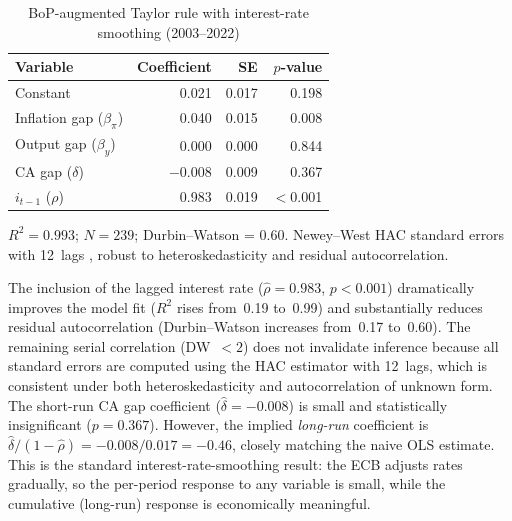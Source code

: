 \begin{table}[htbp]
\centering
\caption{BoP-augmented Taylor rule with interest-rate smoothing (2003--2022)}
\label{tab:ch3_taylor}
\begin{tabular}{@{} l r r r @{}}
\toprule
{Variable} & {Coefficient} & {SE} & {$p$-value} \\
\midrule
Constant              &  0.021 & 0.017 & 0.198 \\
Inflation gap ($\beta_\pi$) &  0.040 & 0.015 & 0.008 \\
Output gap ($\beta_y$)      &  0.000 & 0.000 & 0.844 \\
CA gap ($\delta$)            & $-$0.008 & 0.009 & 0.367 \\
$i_{t-1}$ ($\rho$)           &  0.983 & 0.019 & $<$0.001 \\
\bottomrule
\end{tabular}
\vspace{0.5em}

\begin{minipage}{\textwidth}
\footnotesize $R^2 = 0.993$; $N = 239$; Durbin--Watson = 0.60.  Newey--West HAC standard errors with 12~lags \citep{newey1987simple}, robust to heteroskedasticity and residual autocorrelation.
\end{minipage}
\end{table}

The inclusion of the lagged interest rate ($\hat{\rho} = 0.983$, $p < 0.001$) dramatically improves the model fit ($R^2$ rises from~0.19 to~0.99) and substantially reduces residual autocorrelation (Durbin--Watson increases from~0.17 to~0.60).  The remaining serial correlation (DW~$< 2$) does not invalidate inference because all standard errors are computed using the \citet{newey1987simple} HAC estimator with 12~lags, which is consistent under both heteroskedasticity and autocorrelation of unknown form.  The short-run CA gap coefficient ($\hat{\delta} = -0.008$) is small and statistically insignificant ($p = 0.367$).  However, the implied \emph{long-run} coefficient is $\hat{\delta}/(1-\hat{\rho}) = -0.008 / 0.017 = -0.46$, closely matching the naive OLS estimate.  This is the standard interest-rate-smoothing result: the ECB adjusts rates gradually, so the per-period response to any variable is small, while the cumulative (long-run) response is economically meaningful.

